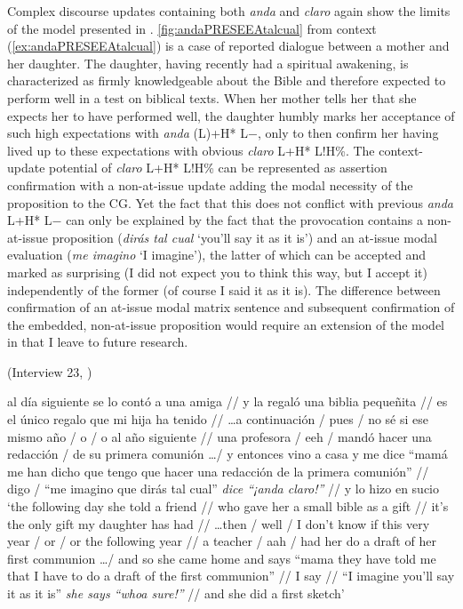 Complex discourse updates containing both \textit{anda} and \textit{claro} again show the limits of the model presented in . \autoref{fig:andaPRESEEAtalcual} from context (\ref{ex:andaPRESEEAtalcual}) is a case of reported dialogue between a mother and her daughter. The daughter, having recently had a spiritual awakening, is characterized as firmly knowledgeable about the Bible and therefore expected to perform well in a test on biblical texts. When her mother tells her that she expects her to have performed well, the daughter humbly marks her acceptance of such high expectations with \textit{anda} (L)+H* L$-$, only to then confirm her having lived up to these expectations with obvious \textit{claro} L+H* L!H\%. The context-update potential of \textit{claro} L+H* L!H\% can be represented as assertion confirmation with a non-at-issue update adding the modal necessity of the proposition to the \ac{CG}. Yet the fact that this does not conflict with previous \textit{anda} L+H* L$-$ can only be explained by the fact that the provocation contains a non-at-issue proposition (\textit{dirás tal cual} `you'll say it as it is') and an at-issue modal evaluation (\textit{me imagino} `I imagine'), the latter of which can be accepted and marked as surprising (I did not expect you to think this way, but I accept it) independently of the former (of course I said it as it is). The difference between confirmation of an at-issue modal matrix sentence and subsequent confirmation of the embedded, non-at-issue proposition would require an extension of the model in  that I leave to future research.\largerpage

\begin{exe}
	\ex (Interview 23, \cite{PRESEEA.20142020})\label{ex:andaPRESEEAtalcual}
	\begin{xlist}[A:]
	 al día siguiente se lo contó a una amiga // y la regaló una biblia pequeñita // es el único regalo que mi hija ha tenido // \ldots a continuación / pues / no sé si ese mismo año / o / o al año siguiente // una profesora / eeh / mandó hacer una redacción / de su primera comunión \ldots / y entonces vino a casa y me dice ``mamá me han dicho que tengo que hacer una redacción de la primera comunión'' // digo / ``me imagino que dirás tal cual'' \textit{dice ``¡anda claro!''} // y lo hizo en sucio  
	\pagebreak\glt `the following day she told a friend // who gave her a small bible as a gift // it's the only gift my daughter has had // \ldots then / well / I don't know if this very year / or / or the following year // a teacher / aah / had her do a draft of her first communion \ldots / and so she came home and says ``mama they have told me that I have to do a draft of the first communion'' // I say // ``I imagine you'll say it as it is'' \textit{she says ``whoa sure!''} // and she did a first sketch'
	\end{xlist}
\end{exe}

